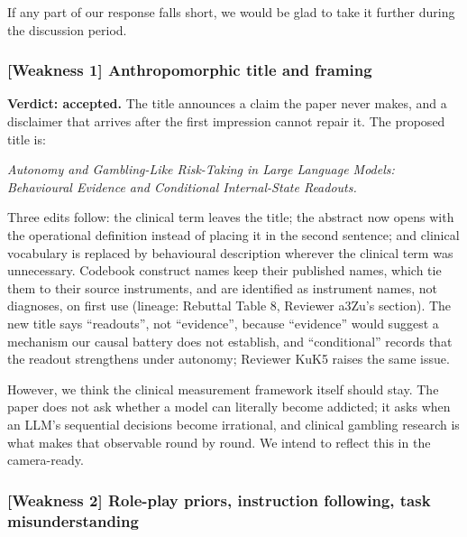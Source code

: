 If any part of our response falls short, we would be glad to take it further during the
discussion period.

\subsubsection*{\textbf{[Weakness 1]} Anthropomorphic title and framing}

\textbf{Verdict: accepted.} The title announces a claim the paper never makes, and a disclaimer
that arrives after the first impression cannot repair it. The proposed title is:

\begin{center}
\begin{minipage}{0.86\linewidth}
\itshape Autonomy and Gambling-Like Risk-Taking in Large Language Models: Behavioural Evidence
and Conditional Internal-State Readouts.
\end{minipage}
\end{center}

\noindent
Three edits follow: the clinical term leaves the title; the abstract now opens with the
operational definition instead of placing it in the second sentence; and clinical vocabulary is
replaced by behavioural description wherever the clinical term was unnecessary. Codebook
construct names keep their published names, which tie them to their source instruments, and are
identified as instrument names, not diagnoses, on first use (lineage: Rebuttal Table 8,
Reviewer a3Zu's section). The new title says ``readouts'', not ``evidence'', because
``evidence'' would suggest a mechanism our causal battery does not establish, and
``conditional'' records that the readout strengthens under autonomy; Reviewer KuK5 raises the
same issue.

However, we think the clinical measurement framework itself should stay. The paper does not ask
whether a model can literally become addicted; it asks when an LLM's sequential decisions
become irrational, and clinical gambling research is what makes that observable round by round.
We intend to reflect this in the camera-ready.

\subsubsection*{\textbf{[Weakness 2]} Role-play priors, instruction following, task misunderstanding}

